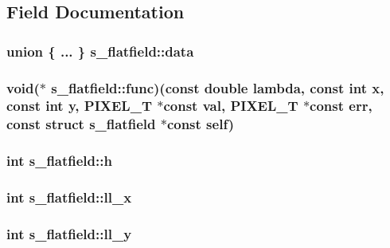 \subsection{Field Documentation}
\hypertarget{structs__flatfield_a8f036c9091ac39aa9d42968bb770af09}{
\subsubsection[{data}]{\setlength{\rightskip}{0pt plus 5cm}union \{ ... \} 
   {\bf s\_\-flatfield::data}}}
\label{structs__flatfield_a8f036c9091ac39aa9d42968bb770af09}
\hypertarget{structs__flatfield_a27ed375a08ad88a9a25ab15f1186daba}{
\subsubsection[{func}]{\setlength{\rightskip}{0pt plus 5cm}void($\ast$ {\bf s\_\-flatfield::func})(const double lambda, const int x, const int y, PIXEL\_\-T $\ast$const val, PIXEL\_\-T $\ast$const err, const struct {\bf s\_\-flatfield} $\ast$const self)}}
\label{structs__flatfield_a27ed375a08ad88a9a25ab15f1186daba}
\hypertarget{structs__flatfield_a8d217598ba3babf676e72e2d8e1d5068}{
\subsubsection[{h}]{\setlength{\rightskip}{0pt plus 5cm}int {\bf s\_\-flatfield::h}}}
\label{structs__flatfield_a8d217598ba3babf676e72e2d8e1d5068}
\hypertarget{structs__flatfield_a1d7f7b9c4eff24588fe25d35f2a0e3ea}{
\subsubsection[{ll\_\-x}]{\setlength{\rightskip}{0pt plus 5cm}int {\bf s\_\-flatfield::ll\_\-x}}}
\label{structs__flatfield_a1d7f7b9c4eff24588fe25d35f2a0e3ea}
\hypertarget{structs__flatfield_affab7067e6e424adb423dc8de163bd5e}{
\subsubsection[{ll\_\-y}]{\setlength{\rightskip}{0pt plus 5cm}int {\bf s\_\-flatfield::ll\_\-y}}}
